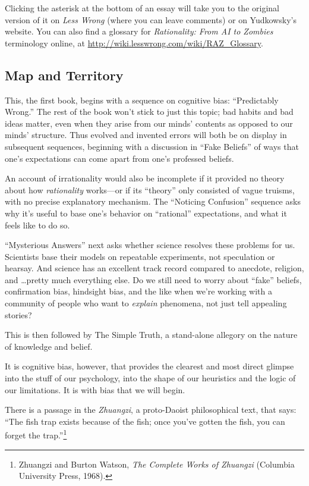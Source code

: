 \documentclass[letterpaper]{book}
\newcommand{\comment}[1]{
}
\begin{document}
{
 Clicking the asterisk at the bottom of an essay will take you to
the original version of it on \textit{Less Wrong} (where you can leave
comments) or on Yudkowsky's website. You can also find
a glossary for \textit{Rationality: From AI to Zombies} terminology
online, at \url{http://wiki.lesswrong.com/wiki/RAZ\_Glossary}.}


\subsection{Map and Territory}

{
 This, the first book, begins with a sequence on cognitive bias:
``Predictably Wrong.'' The rest of
the book won't stick to just this topic; bad habits and
bad ideas matter, even when they arise from our minds'
contents as opposed to our minds' structure. Thus
evolved and invented errors will both be on display in subsequent
sequences, beginning with a discussion in ``Fake
Beliefs'' of ways that one's
expectations can come apart from one's professed
beliefs.}

{
 An account of irrationality would also be incomplete if it
provided no theory about how \textit{rationality} works---or if its
``theory'' only consisted of vague
truisms, with no precise explanatory mechanism. The
``Noticing Confusion'' sequence asks
why it's useful to base one's behavior
on ``rational'' expectations, and
what it feels like to do so.}

{
 ``Mysterious Answers'' next
asks whether science resolves these problems for us. Scientists base
their models on repeatable experiments, not speculation or hearsay. And
science has an excellent track record compared to anecdote, religion,
and \ldots pretty much everything else. Do we still need to worry about
``fake'' beliefs, confirmation bias,
hindsight bias, and the like when we're working with a
community of people who want to \textit{explain} phenomena, not just
tell appealing stories?}

{
 This is then followed by The Simple Truth, a stand-alone allegory
on the nature of knowledge and belief.}

{
 It is cognitive bias, however, that provides the clearest and most
direct glimpse into the stuff of our psychology, into the shape of our
heuristics and the logic of our limitations. It is with bias that we
will begin.}

{
 There is a passage in the \textit{Zhuangzi}, a proto-Daoist
philosophical text, that says: ``The fish trap exists
because of the fish; once you've gotten the fish, you
can forget the trap.''\footnote{Zhuangzi and Burton Watson, \textit{The Complete Works of
Zhuangzi} (Columbia University Press, 1968).\comment{20}}}
\end{document}
